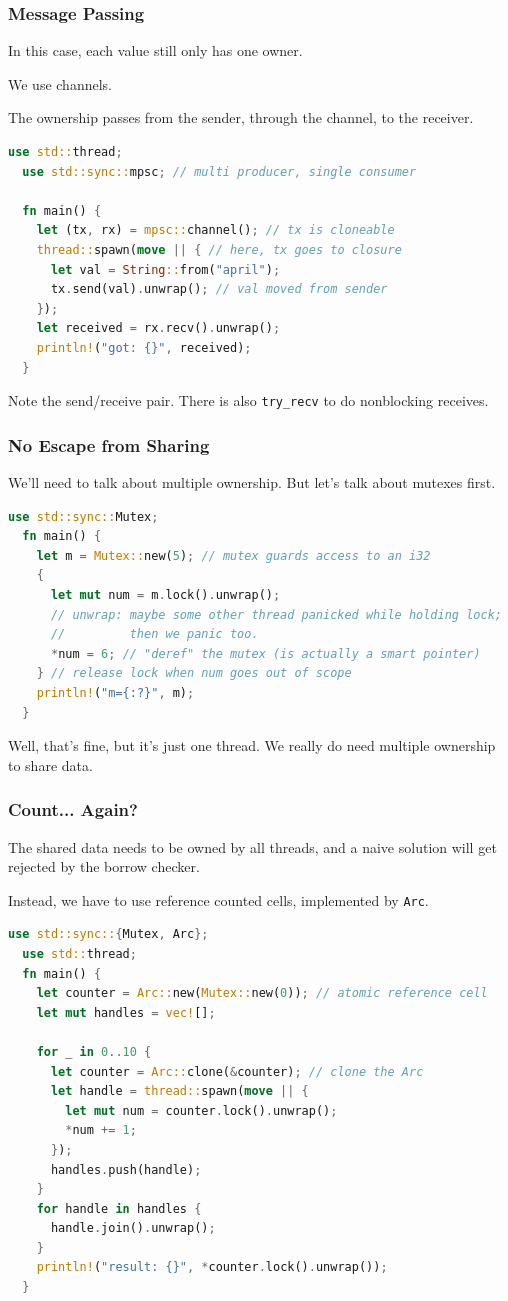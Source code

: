\begin{frame}[fragile]
\frametitle{Message Passing}

In this case, each value still only has one owner. 

We use \alert{channels}. 

The ownership passes
from the sender, through the channel, to the receiver.
\begin{lstlisting}[language=Rust]
  use std::thread;
  use std::sync::mpsc; // multi producer, single consumer

  fn main() {
    let (tx, rx) = mpsc::channel(); // tx is cloneable
    thread::spawn(move || { // here, tx goes to closure
      let val = String::from("april");
      tx.send(val).unwrap(); // val moved from sender
    });
    let received = rx.recv().unwrap();
    println!("got: {}", received);
  }
\end{lstlisting}
Note the send/receive pair. There is also {\tt try\_recv} to do nonblocking receives.


\end{frame}


\begin{frame}[fragile]
\frametitle{No Escape from Sharing}

We'll need to talk about multiple ownership. But let's talk about mutexes first.
\begin{lstlisting}[language=Rust]
  use std::sync::Mutex;
  fn main() {
    let m = Mutex::new(5); // mutex guards access to an i32
    {
      let mut num = m.lock().unwrap();
      // unwrap: maybe some other thread panicked while holding lock;
      //         then we panic too.
      *num = 6; // "deref" the mutex (is actually a smart pointer)
    } // release lock when num goes out of scope
    println!("m={:?}", m);
  }
\end{lstlisting}
Well, that's fine, but it's just one thread. We really do need multiple ownership
to share data.

\end{frame}


\begin{frame}[fragile]
\frametitle{Count... Again?}

 The shared data needs to be owned by all threads, and a naive solution
will get rejected by the borrow checker. 

Instead, we have to use \alert{reference counted
  cells}, implemented by {\tt Arc}.
\begin{lstlisting}[language=Rust]
  use std::sync::{Mutex, Arc};
  use std::thread;
  fn main() {
    let counter = Arc::new(Mutex::new(0)); // atomic reference cell
    let mut handles = vec![];

    for _ in 0..10 {
      let counter = Arc::clone(&counter); // clone the Arc
      let handle = thread::spawn(move || {
        let mut num = counter.lock().unwrap();
        *num += 1;
      });
      handles.push(handle);
    }
    for handle in handles {
      handle.join().unwrap();
    }
    println!("result: {}", *counter.lock().unwrap());
  }
\end{lstlisting}

\end{frame}


